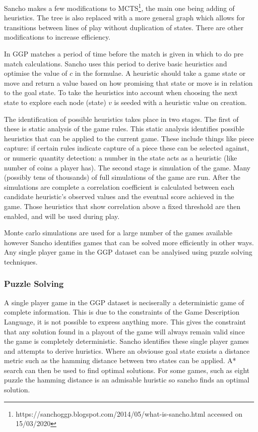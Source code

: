 Sancho makes a few modifications to MCTS\footnote{https://sanchoggp.blogspot.com/2014/05/what-is-sancho.html accessed on 15/03/2020}, the main one being adding of heuristics. The tree is also replaced with a more general graph which allows for transitions between lines of play without duplication of states. There are other modifications to increase efficiency.

In GGP matches a period of time before the match is given in which to do pre match calculations. Sancho uses this period to derive basic heuristics and optimise the value of $c$ in the formulae. A heuristic should take a game state or move and return a value based on how promising that state or move is in relation to the goal state. To take the heuristics into account when choosing the next state to explore each node (state) $v$ is seeded with a heuristic value on creation.

The identification of possible heuristics takes place in two stages. The first of these is static analysis of the game rules. This static analysis identifies possible heuristics that can be applied to the current game. These include things like piece capture: if certain rules indicate capture of a piece these can be selected against, or numeric quantity detection: a number in the state acts as a heuristic (like number of coins a player has). The second stage is simulation of the game. Many (possibly tens of thousands) of full simulations of the game are run. After the simulations are complete a correlation coefficient is calculated between each candidate heuristic's observed values and the eventual score achieved in the game. Those heuristics that show correlation above a fixed threshold are then enabled, and will be used during play.

Monte carlo simulations are used for a large number of the games available however Sancho identifies games that can be solved more efficiently in other ways. Any single player game in the GGP dataset can be analyised using puzzle solving techniques. 
\subsubsection{Puzzle Solving}
A single player game in the GGP dataset is neciserally a deterministic game of complete information. This is due to the constraints of the Game Description Language, it is not possible to express anything more. This gives the constraint that any solution found in a playout of the game will always remain valid since the game is completely deterministic. Sancho identifies these single player games and attempts to derive huristics. Where an obviouse goal state exsists a distance metric such as the hamming distance between two states can be applied. A* search can then be used to find optimal solutions. For some games, such as eight puzzle the hamming distance is an admisable huristic so sancho finds an optimal solution.

